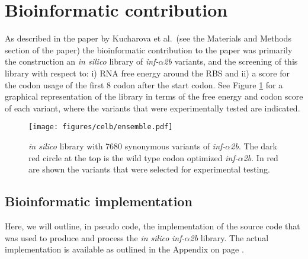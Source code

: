 \section{Bioinformatic contribution}
As described in the paper by Kucharova et al.\ (see the Materials and Methods
section of the paper) the bioinformatic contribution to the paper was primarily
the construction an \textit{in silico} library of \textit{inf-$\alpha$2b}
variants, and the screening of this library with respect to: i) RNA free energy
around the RBS and ii) a score for the codon usage of the first 8 codon after
the start codon. See Figure \ref{fig:ensemble} for a graphical representation
of the library in terms of the free energy and codon score of each variant,
where the variants that were experimentally tested are indicated.

\begin{figure}[b]
	\begin{center}
		\texttt{[image: figures/celb/ensemble.pdf]}
	\end{center}
	\caption{\textit{in silico} library with 7680 synonymous variants of
	\textit{inf-$\alpha$2b}. The dark red circle at the top is the wild type codon
	optimized \textit{inf-$\alpha$2b}. In red are shown the variants that were
	selected for experimental testing.}
	\label{fig:ensemble}
\end{figure}

\subsection{Bioinformatic implementation}
Here, we will outline, in pseudo code, the implementation of the source code
that was used to produce and process the \textit{in silico}
\textit{inf-$\alpha$2b} library. The actual implementation is available as
outlined in the Appendix on page \pageref{source_code}.

\inputminted[fontsize=\small]{python}{pseudo_code/pseudo_code.py}
